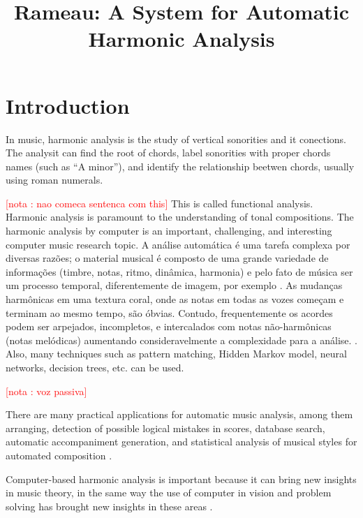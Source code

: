 \documentclass{article}
\title{Rameau: A System for Automatic Harmonic Analysis}
\newcounter{notacounter}
\newcommand{\nota}[1]{
  \addtocounter{notacounter}{1}
  \textcolor{red}{[nota \arabic{notacounter}: #1]}
}
\begin{document}
\maketitle

\begin{abstract}

\end{abstract}

\section{Introduction}
\label{sec:introduction}


In music, harmonic analysis is the study of vertical sonorities and it
conections. The analysit can find the root of chords, label sonorities
with proper chords names (such as ``A minor''), and identify the
relationship beetwen chords, usually using roman numerals.
\nota{nao comeca sentenca com this} This is called functional
analysis. Harmonic analysis is paramount to the understanding of tonal
compositions. The harmonic analysis by computer is an important,
challenging, and interesting computer music research topic. A análise
automática é uma tarefa complexa por diversas razões; o material
musical é composto de uma grande variedade de informações (timbre,
notas, ritmo, dinâmica, harmonia) e pelo fato de música ser um
processo temporal, diferentemente de imagem, por exemplo
\cite{mouton95:numeric}. As mudanças harmônicas em uma textura coral,
onde as notas em todas as vozes começam e terminam ao mesmo tempo, são
óbvias. Contudo, frequentemente os acordes podem ser arpejados,
incompletos, e intercalados com notas não-harmônicas (notas melódicas)
aumentando consideravelmente a complexidade para a análise.
\cite{pardo00:automated}. Also, many techniques such as pattern
matching, Hidden Markov model, neural networks, decision trees, etc.
can be used. \nota{voz passiva}

There are many practical applications for automatic music analysis,
among them arranging, detection of possible logical mistakes in scores,
database search, automatic accompaniment generation, and statistical
analysis of musical styles for automated composition
\cite{pardo02:algorithms,temperley99:modeling}.

Computer-based harmonic analysis is important because it can bring new
insights in music theory, in the same way the use of computer in
vision and problem solving has brought new insights in these areas
\cite{temperley99:modeling}.
\end{document}
